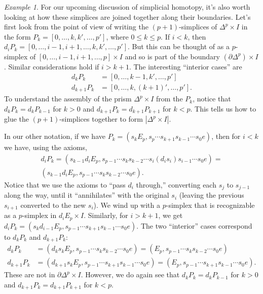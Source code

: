 \documentclass[12pt]{article}
\theoremstyle{plain}
\theoremstyle{definition}
\theoremstyle{remark}
\newtheorem{example}[theorem]{Example}
\newcommand{\bd}{\partial}
\begin{document}
\begin{example}
For our upcoming discussion of simplicial homotopy, it's also worth looking at how these simplices are joined together along their boundaries. Let's first look from the point of view of writing the $(p+1)$-simplices of $\Delta^p\times I$ in the form $P_k=[0,\ldots, k,k',\ldots, p']$, where $0\leq k\leq p$. If $i<k$, then $d_iP_k=[0,\ldots,i-1,i+1,\ldots,k,k',\ldots, p']$. But this can be thought of as a $p$-simplex of $[0,\ldots,i-1,i+1,\ldots, p]\times I$ and so is part of the boundary $(\bd \Delta^p)\times I$. Similar considerations hold if $i>k+1$. The interesting ``interior cases'' are
\begin{align*}
d_kP_k&=[0,\ldots,k-1,k',\ldots,p']\\
d_{k+1}P_k&=[0,\ldots,k,(k+1)',\ldots,p'].
\end{align*}
To understand the assembly of the prism $\Delta^p\times I$ from the $P_k$,  notice that $d_kP_k=d_kP_{k-1}$ for $k>0$ and $d_{k+1}P_k=d_{k+1} P_{k+1}$ for $k<p$. This tells us how to glue the $(p+1)$-simplices together to form $|\Delta^p\times I|$. 

In our other notation, if we have 
$P_k=(s_k E_p, s_{p}\cdots s_{k+1}s_{k-1} \cdots s_{0} e)$, then for $i<k$ we have, using the axioms, 
\begin{multline*}
d_iP_k=(s_{k-1}d_i E_p, s_{p-1}\cdots  s_{k}s_{k-2}\cdots s_i (d_is_i)s_{i-1}\cdots s_{0} e)=\\
(s_{k-1}d_i E_p, s_{p-1}\cdots s_{k}s_{k-2} \cdots s_{0} e).
\end{multline*}
Notice that we use the axioms to   ``pass $d_i$ through,'' converting each $s_j$ to $s_{j-1}$ along the way, until it ``annihilates'' with the original $s_i$ (leaving the previous $s_{i+1}$ converted to the new $s_i$). We wind up with a $p$-simplex that is recognizable as a $p$-simplex in $d_iE_p\times I$. Similarly, for $i>k+1$, we get $d_iP_k=(s_{k}d_{i-1} E_p, s_{p-1}\cdots s_{k+1}s_{k-1} \cdots s_{0} e)$. The two ``interior'' cases correspond to $d_kP_k$ and $d_{k+1}P_k$:
\begin{align*}
d_kP_k&=(d_ks_k E_p, s_{p-1}\cdots s_{k}s_{k-2} \cdots s_{0} e)=(E_p, s_{p-1}\cdots s_{k}s_{k-2} \cdots s_{0} e)\\
d_{k+1}P_k&=(d_{k+1}s_k E_p, s_{p-1}\cdots s_{k+1}s_{k-1} \cdots s_{0} e)=(E_p, s_{p-1}\cdots s_{k+1}s_{k-1} \cdots s_{0} e).
\end{align*}
These are not in $\bd \Delta^p\times I$. However, we do again see that $d_kP_k=d_kP_{k-1}$ for $k>0$ and $d_{k+1}P_k=d_{k+1} P_{k+1}$ for $k<p$.
\end{example}
\end{document}
